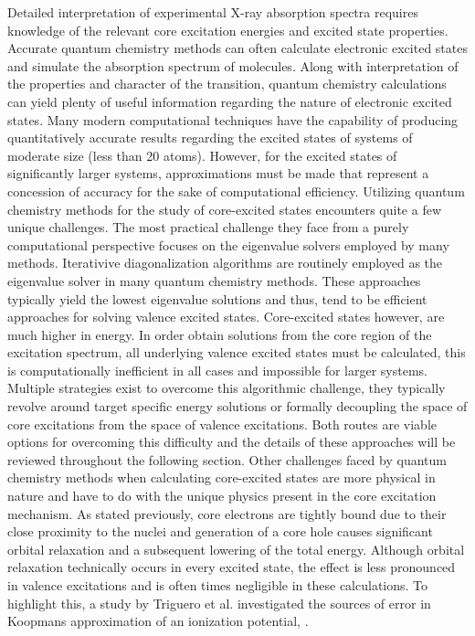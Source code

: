 \documentclass{article}
\begin{document}
Detailed interpretation of experimental X-ray absorption spectra requires knowledge of the relevant core excitation energies and excited state properties. Accurate quantum chemistry methods can often calculate electronic excited states and simulate the absorption spectrum of molecules. Along with interpretation of the properties and character of the transition, quantum chemistry calculations can yield plenty of useful information regarding the nature of electronic excited states. Many modern computational techniques have the capability of producing quantitatively accurate results regarding the excited states of systems of moderate size (less than 20 atoms). \cite{baeck_ab_2003,gwaltney_coupled-cluster_1998,shih_ab_1976,isborn_excited-state_2011} However, for the excited states of significantly larger systems, approximations must be made that represent a concession of accuracy for the sake of computational efficiency. \cite{fantacci_absorption_2003,de_angelis_electronic_2006} Utilizing quantum chemistry methods for the study of core-excited states encounters quite a few unique challenges. The most practical challenge they face from a purely computational perspective focuses on the eigenvalue solvers employed by many methods. Iterativive diagonalization algorithms are routinely employed as the eigenvalue solver in many quantum chemistry methods. \cite{gwaltney_simplified_1996,roos_new_1972,nakatsuji_structure_2001,mazur_application_2009} These approaches typically yield the lowest eigenvalue solutions and thus, tend to be efficient approaches for solving valence excited states. Core-excited states however, are much higher in energy. In order obtain solutions from the core region of the excitation spectrum, all underlying valence excited states must be calculated,\cite{imamura_time-dependent_2006} this is computationally inefficient in all cases and impossible for larger systems. Multiple strategies exist to overcome this algorithmic challenge, they typically revolve around target specific energy solutions \cite{besley_time-dependent_2010,peng_energy-specific_2015,lestrange_calibration_2015} or formally decoupling the space of core excitations from the space of valence excitations.\cite{ehlert_quest_2017,wenzel_calculating_2014} Both routes are viable options for overcoming this difficulty and the details of these approaches will be reviewed throughout the following section. Other challenges faced by quantum chemistry methods when calculating core-excited states are more physical in nature and have to do with the unique physics present in the core excitation mechanism. As stated previously, core electrons are tightly bound due to their close proximity to the nuclei and generation of a core hole causes significant orbital relaxation and a subsequent lowering of the total energy. Although orbital relaxation technically occurs in every excited state, the effect is less pronounced in valence excitations and is often times negligible in these calculations. To highlight this, a study by Triguero et al. \cite{triguero_separate_1999} investigated the sources of error in Koopmans approximation of an ionization potential, . 
\end{document}
